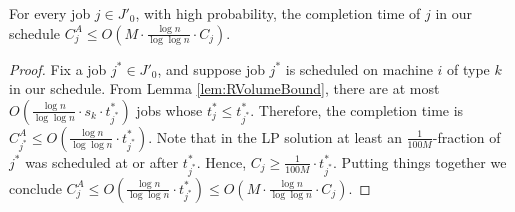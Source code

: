   
  
  
  \begin{lemma}
  \label{lem:completiontimeJ'_0}
  For every job $j \in J'_0$, with high probability, the completion time of $j$ in our schedule $C^{A}_j \leq O( M \cdot \frac{\log n}{\log \log n} \cdot C_j)$.
  \end{lemma}
  \begin{proof}
  Fix a job $j^* \in J'_0$, and suppose job $j^*$ is scheduled on machine $i$ of type $k$ in our schedule.
  From Lemma \ref{lem:RVolumeBound}, there are at most $O( \frac{\log n}{\log \log n} \cdot s_k \cdot t^*_{j^*})$ jobs whose $t^*_j \leq t^*_{j^*}$.
  Therefore, the completion time is  $C^A_{j^*} \leq O(\frac{\log n}{\log \log n} \cdot t^*_{j^*})$.
  Note that in the LP solution at least an $\frac{1}{100M}$-fraction of $j^*$ was scheduled at or after $t^*_{j^*}$.
  Hence, $C_j \geq \frac{1}{100M} \cdot t^*_{j^*}$.
  Putting things together we conclude  $C^{A}_j \leq O(\frac{\log n}{\log \log n} \cdot t_{j^*}^*) \leq O( M \cdot \frac{\log n}{\log \log n} \cdot C_j)$.
  \end{proof}
  
